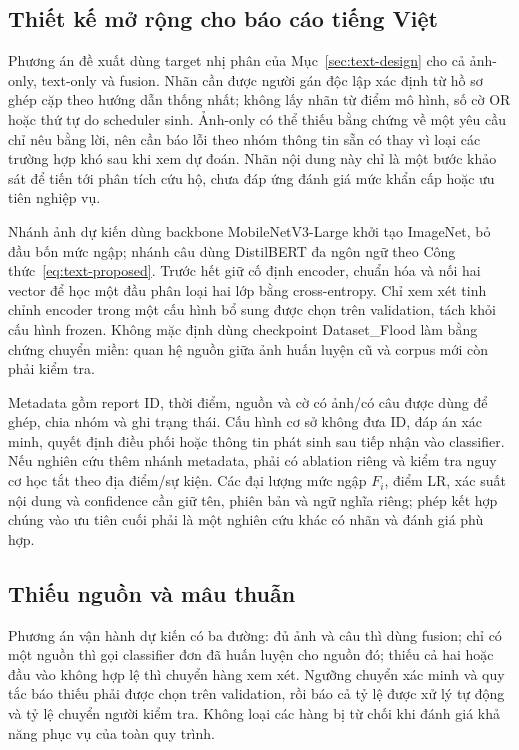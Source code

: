 \subsection{Thiết kế mở rộng cho báo cáo tiếng Việt}
Phương án đề xuất dùng target nhị phân của Mục~\ref{sec:text-design} cho cả ảnh-only, text-only và fusion. Nhãn cần được người gán độc lập xác định từ hồ sơ ghép cặp theo hướng dẫn thống nhất; không lấy nhãn từ điểm mô hình, số cờ OR hoặc thứ tự do scheduler sinh. Ảnh-only có thể thiếu bằng chứng về một yêu cầu chỉ nêu bằng lời, nên cần báo lỗi theo nhóm thông tin sẵn có thay vì loại các trường hợp khó sau khi xem dự đoán. Nhãn nội dung này chỉ là một bước khảo sát để tiến tới phân tích cứu hộ, chưa đáp ứng đánh giá mức khẩn cấp hoặc ưu tiên nghiệp vụ.

Nhánh ảnh dự kiến dùng backbone MobileNetV3-Large khởi tạo ImageNet, bỏ đầu bốn mức ngập; nhánh câu dùng DistilBERT đa ngôn ngữ theo Công thức~\ref{eq:text-proposed}. Trước hết giữ cố định encoder, chuẩn hóa và nối hai vector để học một đầu phân loại hai lớp bằng cross-entropy. Chỉ xem xét tinh chỉnh encoder trong một cấu hình bổ sung được chọn trên validation, tách khỏi cấu hình frozen. Không mặc định dùng checkpoint Dataset\_Flood làm bằng chứng chuyển miền: quan hệ nguồn giữa ảnh huấn luyện cũ và corpus mới còn phải kiểm tra.

Metadata gồm report ID, thời điểm, nguồn và cờ có ảnh/có câu được dùng để ghép, chia nhóm và ghi trạng thái. Cấu hình cơ sở không đưa ID, đáp án xác minh, quyết định điều phối hoặc thông tin phát sinh sau tiếp nhận vào classifier. Nếu nghiên cứu thêm nhánh metadata, phải có ablation riêng và kiểm tra nguy cơ học tắt theo địa điểm/sự kiện. Các đại lượng mức ngập $F_i$, điểm LR, xác suất nội dung và confidence cần giữ tên, phiên bản và ngữ nghĩa riêng; phép kết hợp chúng vào ưu tiên cuối phải là một nghiên cứu khác có nhãn và đánh giá phù hợp.

\subsection{Thiếu nguồn và mâu thuẫn}
Phương án vận hành dự kiến có ba đường: đủ ảnh và câu thì dùng fusion; chỉ có một nguồn thì gọi classifier đơn đã huấn luyện cho nguồn đó; thiếu cả hai hoặc đầu vào không hợp lệ thì chuyển hàng xem xét. Ngưỡng chuyển xác minh và quy tắc báo thiếu phải được chọn trên validation, rồi báo cả tỷ lệ được xử lý tự động và tỷ lệ chuyển người kiểm tra. Không loại các hàng bị từ chối khi đánh giá khả năng phục vụ của toàn quy trình.

